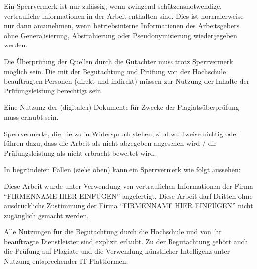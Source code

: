 
Ein Sperrvermerk ist nur zulässig, wenn zwingend schützensnotwendige, vertrauliche Informationen in der Arbeit enthalten sind. Dies ist normalerweise nur dann anzunehmen, wenn betriebsinterne Informationen des Arbeitsgebers ohne Generalisierung, Abstrahierung oder Pseudonymisierung wiedergegeben werden.

\vspace{0.5cm}

Die Überprüfung der Quellen durch die Gutachter muss trotz Sperrvermerk möglich sein. Die mit der Begutachtung und Prüfung von der Hochschule beauftragten Personen (direkt und indirekt) müssen zur Nutzung der Inhalte der Prüfungsleistung berechtigt sein.

\vspace{0.5cm}

Eine Nutzung der (digitalen) Dokumente für Zwecke der Plagiatsüberprüfung muss erlaubt sein.

\vspace{0.5cm}

Sperrvermerke, die hierzu in Widerspruch stehen, sind wahlweise nichtig oder führen dazu, dass die Arbeit als nicht abgegeben angesehen wird / die Prüfungsleistung als nicht erbracht bewertet wird.

\vspace{1cm}

In begründeten Fällen (siehe oben) kann ein Sperrvermerk wie folgt aussehen:

\vspace{0.5cm}

Diese Arbeit wurde unter Verwendung von vertraulichen Informationen der Firma ``FIRMENNAME HIER EINFÜGEN'' angefertigt. Diese Arbeit darf Dritten ohne ausdrückliche Zustimmung der Firma ``FIRMENNAME HIER EINFÜGEN'' nicht zugänglich gemacht werden.

\vspace{0.5cm}

Alle Nutzungen für die Begutachtung durch die Hochschule und von ihr beauftragte Dienstleister sind explizit erlaubt. Zu der Begutachtung gehört auch die Prüfung auf Plagiate und die Verwendung künstlicher Intelligenz unter Nutzung entsprechender IT-Plattformen.

